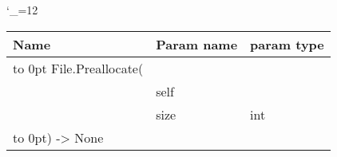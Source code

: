 \begingroup \catcode`\_=12 \tt
\begin{tabular}{lll}
\toprule
\textrm{Name}&\textrm{Param name}&\textrm{param type}\\
\midrule
\hbox to 0pt {File.Preallocate(\hss}\\
& self\\
& size & int\\
\hbox to 0pt{) -> None\hss}\\
\bottomrule
\end{tabular}
\endgroup
